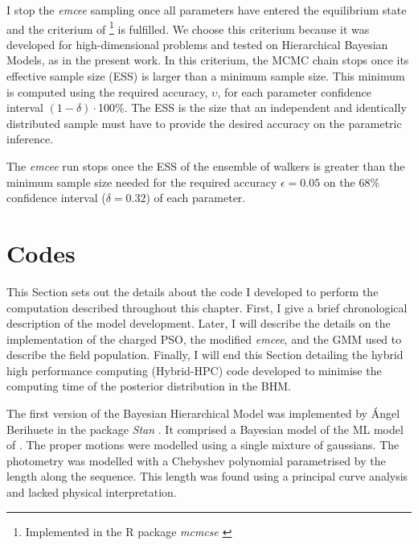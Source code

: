 I stop the \emph{emcee} sampling once all parameters have entered the equilibrium state and the criterium of \citet{Gong2016} \footnote{Implemented in the R package \emph{mcmcse} \citep{mcmcse}} is fulfilled. We choose this criterium because it was developed for high-dimensional problems and tested on Hierarchical Bayesian Models, as in the present work. In this criterium, the MCMC chain stops once its effective sample size (ESS) is larger than a minimum sample size. This minimum is computed using the required accuracy, $\upsilon$, for each parameter confidence interval $(1-\delta)\cdot$100\%. The ESS is the size that an independent and identically distributed sample must have to provide the desired accuracy on the parametric inference. 

The \emph{emcee} run stops once the ESS of the ensemble of walkers is greater than the minimum sample size needed for the required accuracy $\epsilon = 0.05$ on the 68\% confidence interval ($\delta = 0.32$) of each parameter.


\section{Codes}
\label{sect:code}
This Section sets out the details about the code I developed to perform the computation described throughout this chapter. First, I give a brief chronological description of the model development. Later, I will describe the details on the implementation of the charged PSO, the modified \emph{emcee}, and the GMM used to describe the field population. Finally, I will end this Section detailing the hybrid high performance computing (Hybrid-HPC) code developed to minimise the computing time of the posterior distribution in the BHM.

The first version of the Bayesian Hierarchical Model was implemented by \'Angel Berihuete in the package \emph{Stan} \citep{Stan}. It comprised a Bayesian model of the ML model of \citet{Sarro2014}. The proper motions were modelled using a single mixture of gaussians. The photometry was modelled with a Chebyshev polynomial parametrised by the length along the sequence. This length was found using a principal curve analysis and lacked physical interpretation.

